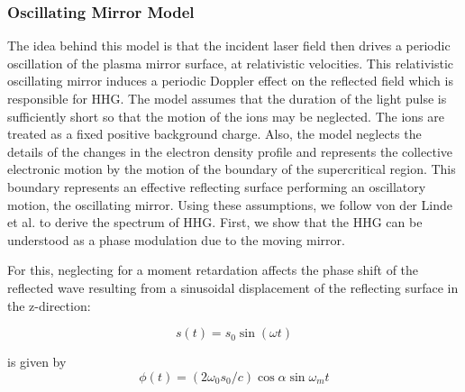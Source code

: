 \documentclass[12pt]{article}
\begin{document}
\subsubsection{Oscillating Mirror Model}
The idea behind this model is that the incident laser field then drives a periodic oscillation of the plasma mirror surface, at relativistic velocities. This relativistic oscillating mirror induces a periodic Doppler effect on the reflected field which is responsible for HHG. The model assumes that the duration of the light pulse is sufficiently short so that the motion of the ions may be neglected. The ions are treated as a fixed positive background charge. Also, the model neglects the details of the changes in the electron density profile and represents the collective electronic motion by the motion of the boundary of the supercritical region. This boundary represents an effective reflecting surface performing an oscillatory motion, the oscillating mirror. Using these assumptions, we follow von der Linde et al.\cite{hhg-main} to derive the spectrum of HHG. First, we show that the HHG can be understood as a phase modulation due to the moving mirror.

For this, neglecting for a moment retardation affects the phase shift of the reflected wave resulting from a sinusoidal displacement of the reflecting surface in the z-direction:

\begin{equation*}
    s(t) = s_0 \sin(\omega t)
\end{equation*}

is given by
\begin{equation*}
    \phi(t) = (2\omega_0s_0/c)\cos\alpha \sin \omega_m t
\end{equation*}
\end{document}
